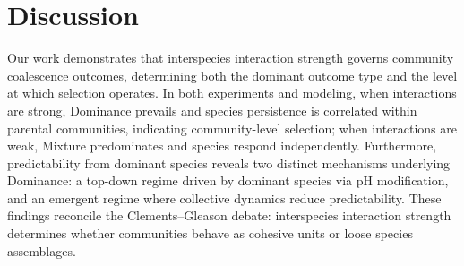 \section{Discussion}
\label{sec:discussion}


Our work demonstrates that interspecies interaction strength governs community coalescence outcomes, determining both the dominant outcome type and the level at which selection operates. In both experiments and modeling, when interactions are strong, Dominance prevails and species persistence is correlated within parental communities, indicating community-level selection; when interactions are weak, Mixture predominates and species respond independently. Furthermore, predictability from dominant species reveals two distinct mechanisms underlying Dominance: a top-down regime driven by dominant species via pH modification, and an emergent regime where collective dynamics reduce predictability. These findings reconcile the Clements--Gleason debate: interspecies interaction strength determines whether communities behave as cohesive units or loose species assemblages.


